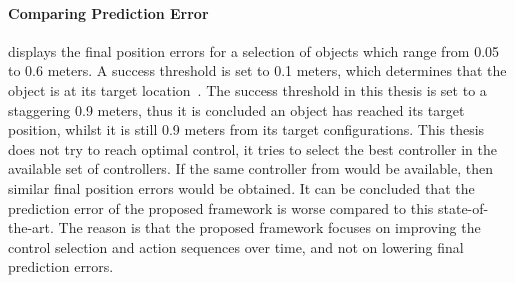 \paragraph{Comparing Prediction Error}
\citeauthor{sabbaghnovin_model_2021} displays the final position errors for a selection of objects which range from 0.05 to 0.6 meters. A success threshold is set to 0.1 meters, which determines that the object is at its target location~\cite{sabbaghnovin_model_2021}. The success threshold in this thesis is set to a staggering 0.9 meters, thus it is concluded an object has reached its target position, whilst it is still 0.9 meters from its target configurations. This thesis does not try to reach optimal control, it tries to select the best controller in the available set of controllers. If the same controller from \citeauthor{sabbaghnovin_model_2021} would be available, then similar final position errors would be obtained. It can be concluded that the prediction error of the proposed framework is worse compared to this state-of-the-art. The reason is that the proposed framework focuses on improving the control selection and action sequences over time, and not on lowering final prediction errors.\bs 

